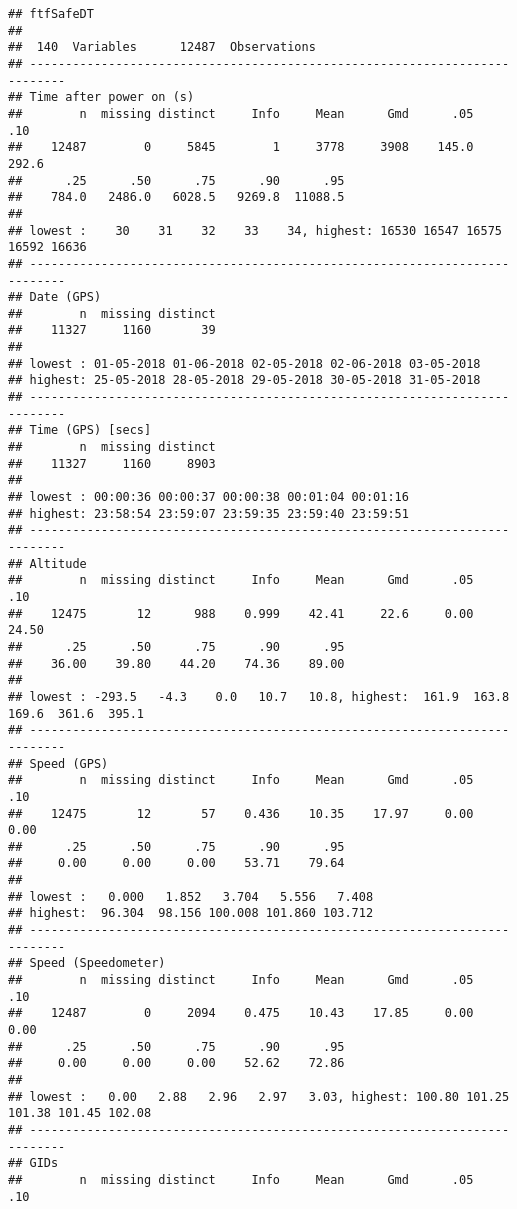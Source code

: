 \documentclass[]{article}
\begin{document}
\begin{verbatim}
## ftfSafeDT 
## 
##  140  Variables      12487  Observations
## ---------------------------------------------------------------------------
## Time after power on (s) 
##        n  missing distinct     Info     Mean      Gmd      .05      .10 
##    12487        0     5845        1     3778     3908    145.0    292.6 
##      .25      .50      .75      .90      .95 
##    784.0   2486.0   6028.5   9269.8  11088.5 
## 
## lowest :    30    31    32    33    34, highest: 16530 16547 16575 16592 16636
## ---------------------------------------------------------------------------
## Date (GPS) 
##        n  missing distinct 
##    11327     1160       39 
## 
## lowest : 01-05-2018 01-06-2018 02-05-2018 02-06-2018 03-05-2018
## highest: 25-05-2018 28-05-2018 29-05-2018 30-05-2018 31-05-2018
## ---------------------------------------------------------------------------
## Time (GPS) [secs] 
##        n  missing distinct 
##    11327     1160     8903 
## 
## lowest : 00:00:36 00:00:37 00:00:38 00:01:04 00:01:16
## highest: 23:58:54 23:59:07 23:59:35 23:59:40 23:59:51
## ---------------------------------------------------------------------------
## Altitude 
##        n  missing distinct     Info     Mean      Gmd      .05      .10 
##    12475       12      988    0.999    42.41     22.6     0.00    24.50 
##      .25      .50      .75      .90      .95 
##    36.00    39.80    44.20    74.36    89.00 
## 
## lowest : -293.5   -4.3    0.0   10.7   10.8, highest:  161.9  163.8  169.6  361.6  395.1
## ---------------------------------------------------------------------------
## Speed (GPS) 
##        n  missing distinct     Info     Mean      Gmd      .05      .10 
##    12475       12       57    0.436    10.35    17.97     0.00     0.00 
##      .25      .50      .75      .90      .95 
##     0.00     0.00     0.00    53.71    79.64 
## 
## lowest :   0.000   1.852   3.704   5.556   7.408
## highest:  96.304  98.156 100.008 101.860 103.712
## ---------------------------------------------------------------------------
## Speed (Speedometer) 
##        n  missing distinct     Info     Mean      Gmd      .05      .10 
##    12487        0     2094    0.475    10.43    17.85     0.00     0.00 
##      .25      .50      .75      .90      .95 
##     0.00     0.00     0.00    52.62    72.86 
## 
## lowest :   0.00   2.88   2.96   2.97   3.03, highest: 100.80 101.25 101.38 101.45 102.08
## ---------------------------------------------------------------------------
## GIDs 
##        n  missing distinct     Info     Mean      Gmd      .05      .10 

\end{verbatim}
\end{document}
